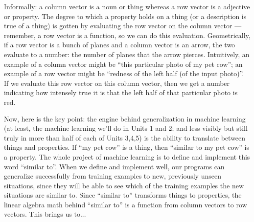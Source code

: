         Informally: a column vector is a noun or thing whereas a row vector is
        a adjective or property.  The degree to which a property holds on a
        thing (or a description is true of a thing) is gotten by evaluating the
        row vector on the column vector --- remember, a row vector is a
        function, so we can do this evaluation.  Geometrically, if a row vector
        is a bunch of planes and a column vector is an arrow, the two evaluate
        to a number: the number of planes that the arrow pierces.  Intuitively,
        an example of a column vector might be ``this particular photo of my
        pet cow''; an example of a row vector might be ``redness of the left
        half (of the input photo)''.  If we evaluate this row vector on this
        column vector, then we get a number indicating how intensely true it is
        that the left half of that particular photo is red.

        Now, here is the key point: the engine behind generalization in machine
        learning (at least, the machine learning we'll do in Units 1 and 2; and
        less visibly but still truly in more than half of each of Units 3,4,5)
        is the ability to translate between things and properties.  If ``my pet
        cow'' is a thing, then ``similar to my pet cow'' is a property.  The whole
        project of machine learning is to define and implement this word
        ``similar to''.  When we define and implement well, our programs can
        generalize successfully from training examples to new, previously
        unseen situations, since they will be able to see which of the training
        examples the new situations are similar to.  Since ``similar to''
        transforms things to properties, the linear algebra math behind
        ``similar to'' is a function from column vectors to row vectors.  This
        brings us to...

